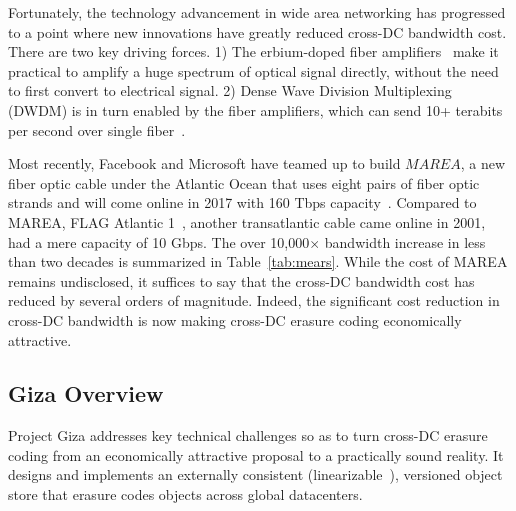 Fortunately, the technology advancement in wide area networking has progressed
to a point where new innovations have greatly reduced cross-DC bandwidth cost.
There are two key driving forces. 1) The erbium-doped fiber
amplifiers~\cite{mears1986low} make it practical to amplify a huge spectrum of
optical signal directly, without the need to first convert to electrical signal.
2) Dense Wave Division Multiplexing (DWDM) is in turn enabled by the fiber
amplifiers, which can send 10+ terabits per second over single fiber~\cite{zhu2011112}.

Most recently, Facebook and Microsoft have teamed up to build $MAREA$, a new
fiber optic cable under the Atlantic Ocean that uses eight pairs of fiber optic
strands and will come online in 2017 with 160 Tbps capacity~\cite{bib:MAREA1,
  bib:MAREA2}. Compared to MAREA, FLAG Atlantic 1~\cite{bib:FA-1}, another
transatlantic cable came online in 2001, had a mere capacity of 10 Gbps. The
over 10,000$\times$ bandwidth increase in less than two decades is summarized in
Table~\ref{tab:mears}. While the cost of MAREA remains undisclosed, it suffices
to say that the cross-DC bandwidth cost has reduced by several orders of
magnitude. Indeed, the significant cost reduction in cross-DC bandwidth is now
making cross-DC erasure coding economically attractive.


\subsection{Giza Overview}

Project Giza addresses key technical challenges so as to turn cross-DC erasure
coding from an economically attractive proposal to a practically sound reality.
It designs and implements an externally consistent
(linearizable~\cite{herlihy90linearizability}), versioned object store that
erasure codes objects across global datacenters.

